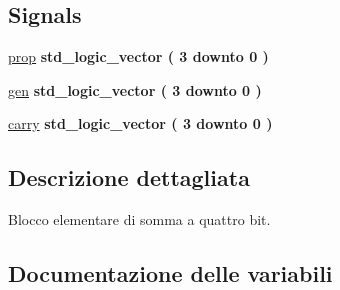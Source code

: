 \subsection*{Signals}
 \begin{DoxyCompactItemize}
\item 
\hyperlink{group___nibble_adder_ga3abd8d433ff039baabc0c6fc2126578b}{prop} {\bfseries \textcolor{vhdlchar}{std\+\_\+logic\+\_\+vector}\textcolor{vhdlchar}{ }\textcolor{vhdlchar}{(}\textcolor{vhdlchar}{ }\textcolor{vhdlchar}{ } \textcolor{vhdldigit}{3} \textcolor{vhdlchar}{ }\textcolor{vhdlchar}{downto}\textcolor{vhdlchar}{ }\textcolor{vhdlchar}{ } \textcolor{vhdldigit}{0} \textcolor{vhdlchar}{ }\textcolor{vhdlchar}{)}\textcolor{vhdlchar}{ }} 
\item 
\hyperlink{group___nibble_adder_gac6c069fe4ec1c0a42272d3de4be6f45f}{gen} {\bfseries \textcolor{vhdlchar}{std\+\_\+logic\+\_\+vector}\textcolor{vhdlchar}{ }\textcolor{vhdlchar}{(}\textcolor{vhdlchar}{ }\textcolor{vhdlchar}{ } \textcolor{vhdldigit}{3} \textcolor{vhdlchar}{ }\textcolor{vhdlchar}{downto}\textcolor{vhdlchar}{ }\textcolor{vhdlchar}{ } \textcolor{vhdldigit}{0} \textcolor{vhdlchar}{ }\textcolor{vhdlchar}{)}\textcolor{vhdlchar}{ }} 
\item 
\hyperlink{group___nibble_adder_ga8f5524d80e551d479327a16bb32abcaa}{carry} {\bfseries \textcolor{vhdlchar}{std\+\_\+logic\+\_\+vector}\textcolor{vhdlchar}{ }\textcolor{vhdlchar}{(}\textcolor{vhdlchar}{ }\textcolor{vhdlchar}{ } \textcolor{vhdldigit}{3} \textcolor{vhdlchar}{ }\textcolor{vhdlchar}{downto}\textcolor{vhdlchar}{ }\textcolor{vhdlchar}{ } \textcolor{vhdldigit}{0} \textcolor{vhdlchar}{ }\textcolor{vhdlchar}{)}\textcolor{vhdlchar}{ }} 
\end{DoxyCompactItemize}


\subsection{Descrizione dettagliata}
Blocco elementare di somma a quattro bit. 



\subsection{Documentazione delle variabili}
\mbox{\label{group___nibble_adder_ga2c8945f4747b9a5448412c95fc281c87}} 
